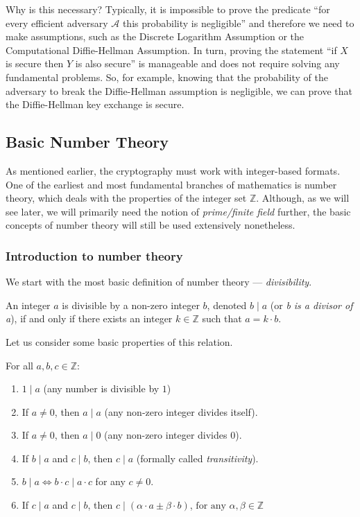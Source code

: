 \documentclass[../lecture-notes.tex]{subfiles}
\begin{document}
\vspace{10pt}

Why is this necessary? Typically, it is impossible to prove the predicate ``for every efficient adversary $\mathcal{A}$ this probability is negligible'' and therefore we need to make assumptions, such as the Discrete Logarithm Assumption or the Computational Diffie-Hellman Assumption. In turn, proving the statement ``if $X$ is secure then $Y$ is also secure'' is manageable and does not require solving any fundamental problems. So, for example,
knowing that the probability of the adversary to break the Diffie-Hellman assumption is negligible, we can prove that the Diffie-Hellman key exchange is secure. 

\subsection{Basic Number Theory}

As mentioned earlier, the cryptography must work with integer-based formats. 
One of the earliest and most fundamental branches of mathematics is number theory, which 
deals with the properties of the integer set $\mathbb{Z}$. Although, as we will see later, 
we will primarily need the notion of \emph{prime/finite field} further, the basic concepts 
of number theory will still be used extensively nonetheless.

\subsubsection{Introduction to number theory}

We start with the most basic definition of number theory --- \emph{divisibility}.

\begin{definition}
    An integer $a$ is divisible by a non-zero integer $b$, denoted $b \mid a$ (or \emph{b is a divisor of a}), if and only if there exists an integer $k \in \mathbb{Z}$ such that $a = k \cdot b$.
\end{definition}

Let us consider some basic properties of this relation.

\begin{lemma}
    For all $a, b, c \in \mathbb{Z}:$
    \hfill
    \begin{enumerate}
        \item $1 \mid a$ (any number is divisible by $1$)
        \item If $a \neq 0$, then $a \mid a$ (any non-zero integer divides itself).
        \item If $a \neq 0$, then $a \mid 0$ (any non-zero integer divides $0$).
        \item If $b \mid a$ and $c \mid b$, then $c \mid a$ (formally called \emph{transitivity}).
        \item $b \mid a \iff b \cdot c \mid a \cdot c$ for any $c \neq 0$.
        \item If $c \mid a$ and $c \mid b$, then $c \mid (\alpha \cdot a \pm \beta \cdot b)$, $\text{for any } \alpha, \beta \in \mathbb{Z}$
    \end{enumerate}
\end{lemma}
\end{document}
